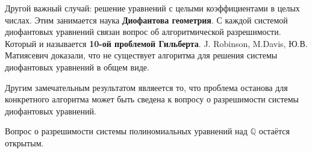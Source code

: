\documentclass{article}
\begin{document}
    Другой важный случай: решение уравнений с целыми коэффициентами в целых числах.
Этим занимается наука \textbf{Диофантова геометрия}. С каждой системой диофантовых уравнений связан вопрос об алгоритмической разрешимости.
Который и называется \textbf{10-ой проблемой Гильберта}. J. Robinson, M.Davis, Ю.В. Матиясевич доказали, что не существует алгоритма для решения системы диофантовых уравнений в общем виде.

Другим замечательным результатом являеется то, что проблема останова для конкретного алгоритма может быть сведена к вопросу о разрешимости системы диофантовых уравнений.

Вопрос о разрешимости системы полиномиальных уравнений над $\mathbb{Q}$ остаётся открытым.
\end{document}
